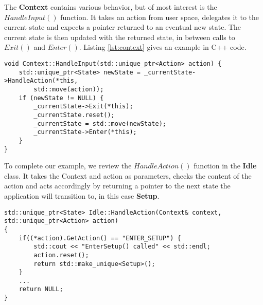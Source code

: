 The \textbf{Context} contains various behavior, but of most interest is the $HandleInput()$ function. It takes an action from user space, delegates it to the current state and expects a pointer returned to an eventual new state. The current state is then updated with the returned state, in between calls to $Exit()$ and $Enter()$. Listing \ref{lst:context} gives an example in C++ code.

\begin{lstlisting}[style=customc++,caption={The Context class holds the current state among other variables, such as best chromosome so far and parameters. Here is showed the function HandleInput() called from user side.},label={lst:context}]
void Context::HandleInput(std::unique_ptr<Action> action) {
	std::unique_ptr<State> newState = _currentState->HandleAction(*this,
		std::move(action));
	if (newState != NULL) {
		_currentState->Exit(*this);
		_currentState.reset();
		_currentState = std::move(newState);
		_currentState->Enter(*this);
	}
}
\end{lstlisting}

To complete our example, we review the $HandleAction()$ function in the \textbf{Idle} class. It takes the Context and action as parameters, checks the content of the action and acts accordingly by returning a pointer to the next state the application will transition to, in this case \textbf{Setup}.

\begin{lstlisting}[style=customc++,caption={The HandleAction() function in state Idle.},label={lst:stateidle}]
std::unique_ptr<State> Idle::HandleAction(Context& context, std::unique_ptr<Action> action)
{
	if((*action).GetAction() == "ENTER_SETUP") {
		std::cout << "EnterSetup() called" << std::endl;
		action.reset();
		return std::make_unique<Setup>();
	}
	...
	return NULL;
}
\end{lstlisting}
